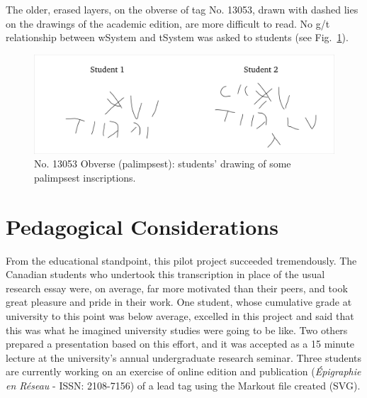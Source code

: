 \documentclass[amsthm,ebook]{saparticle}
\begin{document}

The older, erased layers, on the obverse of tag No. 13053, drawn with dashed lies on the drawings of the academic edition, are more difficult to read. No
g/t relationship between wSystem and tSystem was asked to students (see Fig.~\ref{fig:4}).

\begin{figure}[!hbp]
\centering
\includegraphics[scale=0.25]{EAGLE16lameetalteaching-img012.png}
\caption{No. 13053 Obverse (palimpsest): students' drawing of some palimpsest inscriptions.}
\label{fig:4}
\end{figure}


\section{Pedagogical Considerations}


From the educational standpoint, this pilot project succeeded tremendously. The Canadian students who undertook this
transcription in place of the usual research essay were, on average, far more motivated than their peers, and took
great pleasure and pride in their work. One student, whose cumulative grade at university to this point was below
average, excelled in this project and said that this was what he imagined university studies were going to be like. Two
others prepared a presentation based on this effort, and it was accepted as a 15 minute lecture at the university’s
annual undergraduate research seminar. Three students are currently working on an exercise of online edition and publication (\emph{Épigraphie en Réseau} - ISSN: 2108-7156) of a lead tag using the Markout file created (SVG).
\end{document}
